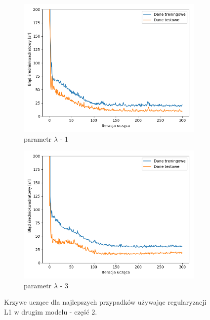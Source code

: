 \documentclass[12pt]{aghdpl}
\begin{document}
		\begin{figure}[h]
			\centering
		 	\begin{subfigure}{.8\linewidth}
		 		\includegraphics[width =\linewidth]{wykresy/6_regularyzacja/l1/regularyzacja_1_wykres_uczenia.png}
		 		\caption{parametr $\lambda$ - 1}
		 	\end{subfigure}
		 	\begin{subfigure}{.8\linewidth}
		 		\includegraphics[width =\linewidth]{wykresy/6_regularyzacja/l1/regularyzacja_3_wykres_uczenia.png}
		 		\caption{parametr $\lambda$ - 3}
		 	\end{subfigure}
		  	
		  	\caption{Krzywe uczące dla najlepszych przypadków używając regularyzacji L1 w drugim modelu - część 2.}
			\label{fig: drugi_model_przy_regularyzacji_l1_wykresy_uczenia_2}
		\end{figure}
		 	
\end{document}
